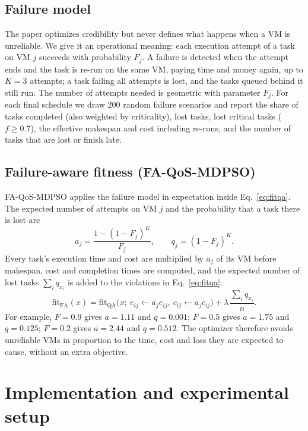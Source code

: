\documentclass[pdflatex,sn-basic]{sn-jnl}
\theoremstyle{thmstyleone}%
\theoremstyle{thmstyletwo}%
\theoremstyle{thmstylethree}%
\newcommand{\fitQA}{\mathrm{fit}_{\mathrm{QA}}}
\newcommand{\fitFA}{\mathrm{fit}_{\mathrm{FA}}}
\begin{document}
\subsection{Failure model}\label{sec5.3}
The paper optimizes credibility but never defines what happens when a VM is unreliable. We give it an operational meaning: each execution attempt of a task on VM $j$ succeeds with probability $F_j$. A failure is detected when the attempt ends and the task is re-run on the same VM, paying time and money again, up to $K=3$ attempts; a task failing all attempts is lost, and the tasks queued behind it still run. The number of attempts needed is geometric with parameter $F_j$. For each final schedule we draw 200 random failure scenarios and report the share of tasks completed (also weighted by criticality), lost tasks, lost critical tasks ($f\ge0.7$), the effective makespan and cost including re-runs, and the number of tasks that are lost or finish late.

\subsection{Failure-aware fitness (FA-QoS-MDPSO)}\label{sec5.4}
FA-QoS-MDPSO applies the failure model in expectation inside Eq.~\eqref{eq:fitqa}. The expected number of attempts on VM $j$ and the probability that a task there is lost are
\begin{equation}
a_j=\frac{1-(1-F_j)^{K}}{F_j},\qquad q_j=(1-F_j)^{K}.
\label{eq:aq}
\end{equation}
Every task's execution time and cost are multiplied by $a_j$ of its VM before makespan, cost and completion times are computed, and the expected number of lost tasks $\sum_i q_{x_i}$ is added to the violations in Eq.~\eqref{eq:fitqa}:
\begin{equation}
\fitFA(x)=\fitQA\bigl(x;\ e_{ij}\!\leftarrow\!a_je_{ij},\ c_{ij}\!\leftarrow\!a_jc_{ij}\bigr)+\lambda\,\frac{\sum_{i}q_{x_i}}{n}.
\label{eq:fitfa}
\end{equation}
For example, $F=0.9$ gives $a=1.11$ and $q=0.001$; $F=0.5$ gives $a=1.75$ and $q=0.125$; $F=0.2$ gives $a=2.44$ and $q=0.512$. The optimizer therefore avoids unreliable VMs in proportion to the time, cost and loss they are expected to cause, without an extra objective.

\section{Implementation and experimental setup}\label{sec6}
\end{document}
